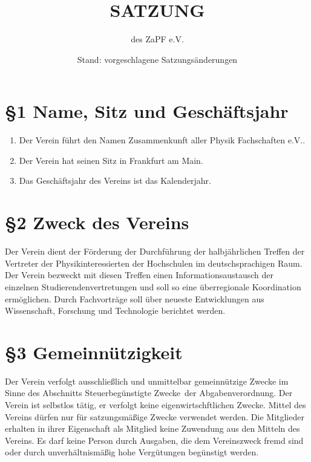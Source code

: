 \documentclass[ngerman]{article}
\begin{document}
\title{SATZUNG}
\date{Stand: vorgeschlagene Satzungsänderungen}

\author{des \textquotedbl{}ZaPF
e.V.\textquotedbl{}}

\maketitle



\section*{§1 Name, Sitz und Geschäftsjahr}
\begin{enumerate}
\item Der Verein führt den Namen \glqq Zusammenkunft aller Physik Fachschaften e.V.\grqq.
\item Der Verein hat seinen Sitz in Frankfurt am Main.
\item Das Geschäftsjahr des Vereins ist das Kalenderjahr.
\end{enumerate}


\section*{§2 Zweck des Vereins}
Der Verein dient der Förderung der Durchführung der halbjährlichen Treffen der Vertreter der Physikinteressierten der Hochschulen im deutschsprachigen Raum.
Der Verein bezweckt mit diesen Treffen einen Informationsaustausch der einzelnen Studierendenvertretungen und soll so eine überregionale Koordination ermöglichen. Durch Fachvorträge soll über neueste Entwicklungen aus Wissenschaft, Forschung und Technologie berichtet werden.


\section*{§3 Gemeinnützigkeit}
Der Verein verfolgt ausschließlich und unmittelbar gemeinnützige Zwecke im Sinne des Abschnitts \glqq Steuerbegünstigte Zwecke\grqq\ der Abgabenverordnung. Der Verein ist selbstlos tätig, er verfolgt keine eigenwirtschftlichen Zwecke. Mittel des Vereins dürfen nur für satzungsmäßige Zwecke verwendet werden. Die Mitglieder erhalten in
ihrer Eigenschaft als Mitglied keine Zuwendung aus den Mitteln des Vereins. Es darf keine Person durch Ausgaben, die dem Vereinszweck fremd sind oder durch unverhältnismäßig hohe Vergütungen begünstigt werden.
\end{document}
